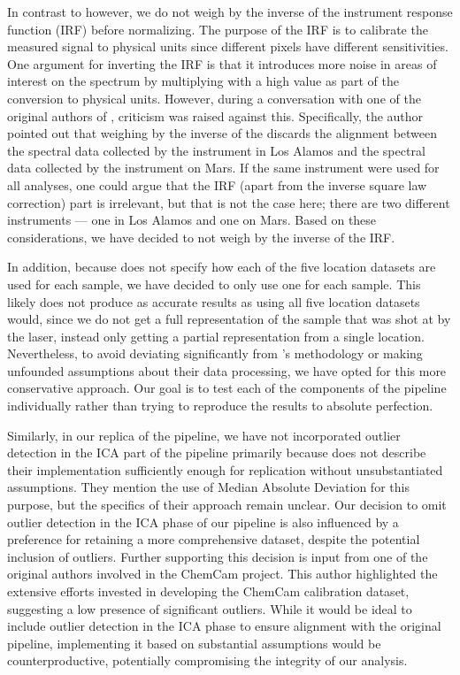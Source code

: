 In contrast to \citet{cleggRecalibrationMarsScience2017} however, we do not weigh by the inverse of the instrument response function (IRF) before normalizing.
The purpose of the IRF is to calibrate the measured signal to physical units since different pixels have different sensitivities\cite{wiensChemcam2012}.
One argument for inverting the IRF is that it introduces more noise in areas of interest on the spectrum by multiplying with a high value as part of the conversion to physical units.
However, during a conversation with one of the original authors of \citet{cleggRecalibrationMarsScience2017}, criticism was raised against this.
Specifically, the author pointed out that weighing by the inverse of the discards the alignment between the spectral data collected by the instrument in Los Alamos and the spectral data collected by the instrument on Mars.
If the same instrument were used for all analyses, one could argue that the IRF (apart from the inverse square law correction) part is irrelevant, but that is not the case here; there are two different instruments --- one in Los Alamos and one on Mars.
Based on these considerations, we have decided to not weigh by the inverse of the IRF.

In addition, because \citet{cleggRecalibrationMarsScience2017} does not specify how each of the five location datasets are used for each sample, we have decided to only use one for each sample.
This likely does not produce as accurate results as using all five location datasets would, since we do not get a full representation of the sample that was shot at by the laser, instead only getting a partial representation from a single location.
Nevertheless, to avoid deviating significantly from \citet{cleggRecalibrationMarsScience2017}'s methodology or making unfounded assumptions about their data processing, we have opted for this more conservative approach.
Our goal is to test each of the components of the pipeline individually rather than trying to reproduce the results to absolute perfection.

Similarly, in our replica of the pipeline, we have not incorporated outlier detection in the ICA part of the pipeline primarily because \citet{cleggRecalibrationMarsScience2017} does not describe their implementation sufficiently enough for replication without unsubstantiated assumptions.
They mention the use of Median Absolute Deviation for this purpose, but the specifics of their approach remain unclear.
Our decision to omit outlier detection in the ICA phase of our pipeline is also influenced by a preference for retaining a more comprehensive dataset, despite the potential inclusion of outliers.
Further supporting this decision is input from one of the original authors involved in the ChemCam project.
This author highlighted the extensive efforts invested in developing the ChemCam calibration dataset, suggesting a low presence of significant outliers.
While it would be ideal to include outlier detection in the ICA phase to ensure alignment with the original pipeline, implementing it based on substantial assumptions would be counterproductive, potentially compromising the integrity of our analysis.

